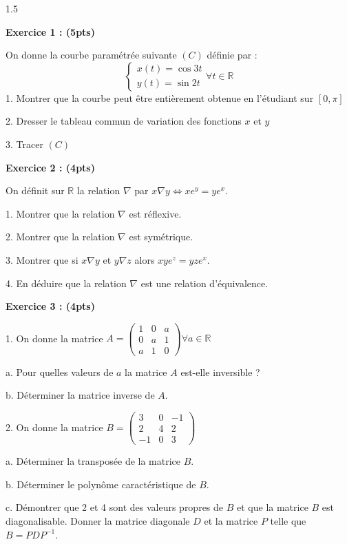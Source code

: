 \documentclass[12pt]{article}
\begin{document}
\begin{spacing}{1.5}

\textbf{Exercice 1 : (5pts)}

On donne la courbe paramétrée suivante $(C)$ définie par : 
\[
\begin{cases}
x(t)=\cos{3t}\\
y(t)=\sin{2t}
\end{cases}\forall {t\in \mathbb{R}}
\]
1. Montrer que la courbe peut être entièrement obtenue en l'étudiant sur $[0,\pi]$

2. Dresser le tableau commun de variation des fonctions $x$ et $y$

3. Tracer $(C)$

\textbf{Exercice 2 : (4pts)}

On définit sur $\mathbb{R}$ la relation $\nabla$ par $x\nabla y\Longleftrightarrow xe^y=ye^x$.

1. Montrer que la relation $\nabla$ est réflexive.

2. Montrer que la relation $\nabla$ est symétrique.

3. Montrer que si $x\nabla y$ et $y\nabla z$ alors $xye^z = yze^x$.

4. En déduire que la relation $\nabla$ est une relation d'équivalence.

\textbf{Exercice 3 : (4pts)}

1. On donne la matrice $A=\begin{pmatrix}
1 & 0 & a \\ 
0 & a & 1 \\ 
a & 1 & 0
\end{pmatrix} \forall a\in \mathbb{R}$

a. Pour quelles valeurs de $a$ la matrice $A$ est-elle inversible ?

b. Déterminer la matrice inverse de $A$.

2. On donne la matrice $B=\begin{pmatrix}
3 & 0 & -1 \\ 
2 & 4 & 2 \\ 
-1 & 0 & 3
\end{pmatrix}$  

a. Déterminer la transposée de la matrice $B$.

b. Déterminer le polynôme caractéristique de $B$.

c. Démontrer que 2 et 4 sont des valeurs propres de $B$ et que la matrice $B$ est diagonalisable. Donner la matrice diagonale $D$ et la matrice $P$ telle que $B=PDP^{-1}$.


\end{spacing}
\end{document}
